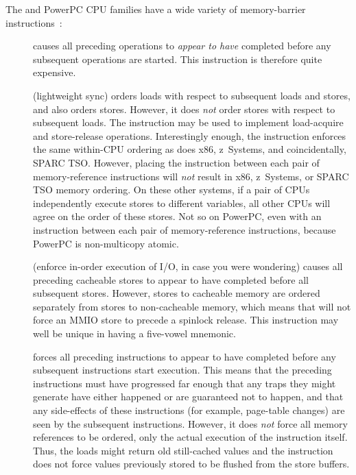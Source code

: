 The \Power{} and PowerPC CPU families have a wide variety of memory-barrier
instructions~\cite{PowerPC94,MichaelLyons05a}:
\begin{description}
\item	[] causes all preceding operations to {\em appear to have}
	completed before any subsequent operations are started.
	This instruction is therefore quite expensive.
\item	[] (lightweight sync) orders loads with respect to
	subsequent loads and stores, and also orders stores.
	However, it does {\em not} order stores with respect to subsequent
	loads.
	The  instruction may be used to implement
	load-acquire and store-release operations.
	Interestingly enough, the  instruction enforces
	the same within-CPU ordering as does x86, z~Systems, and coincidentally,
	SPARC TSO\@.
	However, placing the  instruction between each
	pair of memory-reference instructions will \emph{not}
	result in x86, z~Systems, or SPARC TSO memory ordering.
	On these other systems, if a pair of CPUs independently execute
	stores to different variables, all other CPUs will agree on the
	order of these stores.
	Not so on PowerPC, even with an  instruction between each
	pair of memory-reference instructions, because PowerPC is
	non-multicopy atomic.
\item	[] (enforce in-order execution of I/O, in case you
	were wondering) causes all preceding cacheable stores to appear
	to have completed before all subsequent stores.
	However, stores to cacheable memory are ordered separately from
	stores to non-cacheable memory, which means that 
	will not force an MMIO store to precede a spinlock release.
	This instruction may well be unique in having a five-vowel mnemonic.
\item	[] forces all preceding instructions to appear to have
	completed before any subsequent instructions start execution.
	This means that the preceding instructions must have progressed
	far enough that any traps they might generate have either happened
	or are guaranteed not to happen, and that any side-effects of
	these instructions (for example, page-table changes) are seen by the
	subsequent instructions.
	However, it does \emph{not} force all memory references to be
	ordered, only the actual execution of the instruction itself.
	Thus, the loads might return old still-cached values and the
	 instruction does not force values previously stored
	to be flushed from the store buffers.
\end{description}

